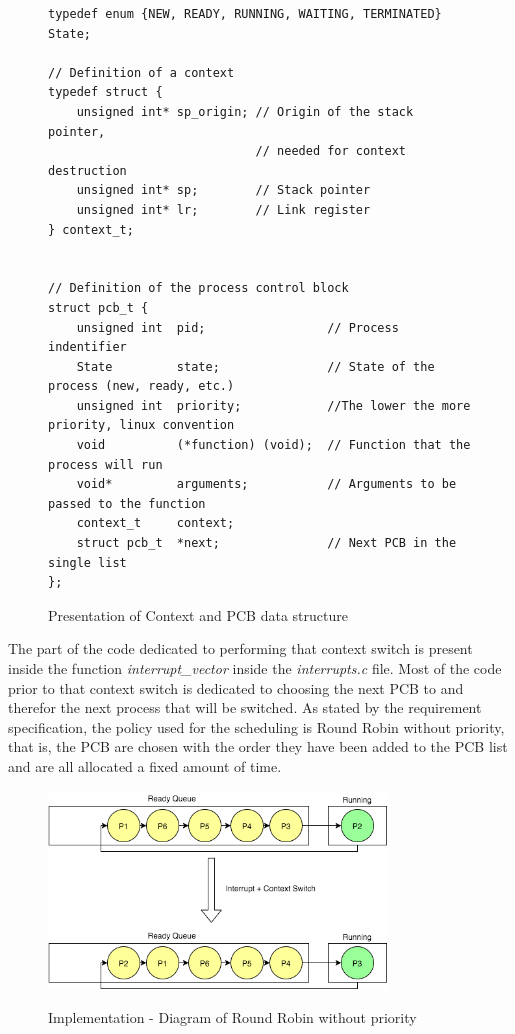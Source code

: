\lstset{language=C}
\begin{figure}[H]
\begin{minipage}{\linewidth}
\begin{lstlisting}[frame=single]
typedef enum {NEW, READY, RUNNING, WAITING, TERMINATED} State;

// Definition of a context
typedef struct {
    unsigned int* sp_origin; // Origin of the stack pointer,
                             // needed for context destruction
    unsigned int* sp;        // Stack pointer
    unsigned int* lr;        // Link register
} context_t;


// Definition of the process control block
struct pcb_t {
    unsigned int  pid;                 // Process indentifier
    State         state;               // State of the process (new, ready, etc.)
    unsigned int  priority;            //The lower the more priority, linux convention
    void          (*function) (void);  // Function that the process will run
    void*         arguments;           // Arguments to be passed to the function
    context_t     context;
    struct pcb_t  *next;               // Next PCB in the single list
};
\end{lstlisting}
\end{minipage}
\caption{Presentation of Context and PCB data structure}
\label{fig:chapter5_context_pcb_data_structure}
\end{figure}


The part of the code dedicated to performing that context switch is present inside the function \textit{interrupt\_vector} inside the \textit{interrupts.c} file. Most of the code prior to that context switch is dedicated to choosing the next PCB to and therefor the next process that will be switched. As stated by the requirement specification, the policy used for the scheduling is Round Robin without priority, that is, the PCB are chosen with the order they have been added to the PCB list and are all allocated a fixed amount of time.

\begin{figure}[H]
\begin{center}
\includegraphics[width=0.8\textwidth]{includes/figures/chapter5_round_robidn_diagram.png}  \\
\caption{Implementation - Diagram of Round Robin without priority}
\end{center}
\label{fig:chapter5_round_robidn_diagram}
\end{figure}



